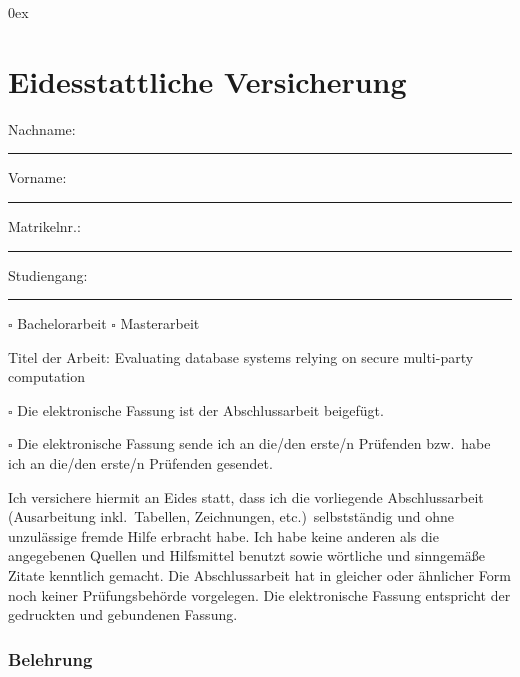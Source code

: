 \begin{small}

  \parindent0ex

  \chapter*{Eidesstattliche Versicherung}

  \thispagestyle{empty}

  \bigskip

  Nachname: \parbox[t]{.343\linewidth}{\rule[-3pt]{\linewidth}{.4pt}} \hspace{2ex} Vorname:  \parbox[t]{.35\linewidth}{\rule[-3pt]{\linewidth}{.4pt}}

  \vspace{2\bigskipamount}

  Matrikelnr.: \parbox[t]{.15\linewidth}{\rule[-3pt]{\linewidth}{.4pt}} \hspace{2ex} Studiengang: \parbox[t]{.5\linewidth}{\rule[-3pt]{\linewidth}{.4pt}}

  \bigskip

  $\square$ Bachelorarbeit \hspace{1ex} $\square$ Masterarbeit

  \bigskip

  Titel der Arbeit: Evaluating database systems relying on secure multi-party computation 

  \bigskip

  $\square$ Die elektronische Fassung ist der Abschlussarbeit beigefügt.

  \bigskip

  $\square$ Die elektronische Fassung sende ich an die/den erste/n Prüfenden bzw.~habe ich an die/den erste/n Prüfenden gesendet.

  \bigskip

  Ich versichere hiermit an Eides statt, dass ich die vorliegende Abschlussarbeit (Ausarbeitung inkl.~Tabellen, Zeichnungen, etc.)~selbstständig und ohne unzulässige fremde Hilfe erbracht habe.
  Ich habe keine anderen als die angegebenen Quellen und Hilfsmittel benutzt sowie wörtliche und sinngemäße Zitate kenntlich gemacht.
  Die Abschlussarbeit hat in gleicher oder ähnlicher Form noch keiner Prüfungsbehörde vorgelegen.
  Die elektronische Fassung entspricht der gedruckten und gebundenen Fassung.

  \subsection*{Belehrung}


\end{small}
